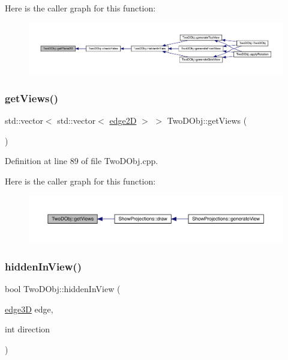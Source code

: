 Here is the caller graph for this function\+:
\nopagebreak
\begin{figure}[H]
\begin{center}
\leavevmode
\includegraphics[width=350pt]{class_two_d_obj_a265505612ca1a250f29052cb303d7762_icgraph}
\end{center}
\end{figure}
\mbox{\label{class_two_d_obj_a0e7b5705ad697c100b39a1475b46475a}} 
\subsubsection{\texorpdfstring{get\+Views()}{getViews()}}
{\footnotesize\ttfamily std\+::vector$<$ std\+::vector$<$ \mbox{\hyperlink{structedge2_d}{edge2D}} $>$ $>$ Two\+D\+Obj\+::get\+Views (\begin{DoxyParamCaption}{ }\end{DoxyParamCaption})}



Definition at line 89 of file Two\+D\+Obj.\+cpp.

Here is the caller graph for this function\+:
\nopagebreak
\begin{figure}[H]
\begin{center}
\leavevmode
\includegraphics[width=350pt]{class_two_d_obj_a0e7b5705ad697c100b39a1475b46475a_icgraph}
\end{center}
\end{figure}
\mbox{\label{class_two_d_obj_ab0d27341367906fc4f4d9e5e8b4b8543}} 
\subsubsection{\texorpdfstring{hidden\+In\+View()}{hiddenInView()}}
{\footnotesize\ttfamily bool Two\+D\+Obj\+::hidden\+In\+View (\begin{DoxyParamCaption}\item[{\mbox{\hyperlink{structedge3_d}{edge3D}}}]{edge,  }\item[{int}]{direction }\end{DoxyParamCaption})}



